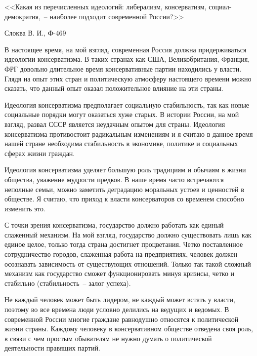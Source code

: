 \documentclass[pscyr,notitlepage]{hedwork}
\begin{document}
  \onehalfspacing
  \begin{center}
    <<Какая из перечисленных идеологий: либерализм, консерватизм,
      социал-демократия,~-- наиболее подходит современной России?>>
  \end{center}  
  \vspace{-2em}
  \begin{flushright}
    Слоква В. И., Ф-469
  \end{flushright}

  В настоящее время, на мой взгляд, современная Россия должна придерживаться
  идеологии консерватизма. В таких странах как США, Великобритания, Франция,
  ФРГ довольно длительное время консервативные партии находились у власти.
  Глядя на опыт этих стран и политическую атмосферу настоящего времени можно
  сказать, что данный опыт оказал положительное влияние на эти страны.

  Идеология консерватизма предполагает социальную стабильность, так как новые
  социальные порядки могут оказаться хуже старых. В истории России, на мой
  взгляд, развал СССР является неудачным опытом для страны. Идеология
  консерватизма противостоит радикальным изменениям и я считаю в данное время
  нашей стране необходима стабильность в экономике, политике и социальных сферах
  жизни граждан.

  Идеология консерватизма уделяет большую роль традициям и обычаям в жизни
  общества, уважение мудрости предков. В наше время часто встречаются неполные
  семьи, можно заметить деградацию моральных устоев и ценностей в обществе. Я
  считаю, что приход к власти консерваторов со временем способно изменить это.

  С точки зрения консерватизма, государство должно работать как единый слаженный
  механизм. На мой взгляд, государство должно существовать лишь как единое
  целое, только тогда страна достигнет процветания. Четко поставленное
  сотрудничество городов, слаженная работа на предприятиях, человек должен
  осознавать зависимость от существующих отношений. Только так такой сложный
  механизм как государство сможет функционировать минуя кризисы, четко и
  стабильно (стабильность~-- залог успеха).

  Не каждый человек может быть лидером, не каждый может встать у власти, поэтому
  во все времена люди условно делились на ведущих и ведомых. В современной
  России многие граждане равнодушно относятся к политической жизни страны.
  Каждому человеку в консервативном обществе отведена своя роль, в связи с чем
  простым обывателям не нужно думать о политической деятельности правящих
  партий.
\end{document}
